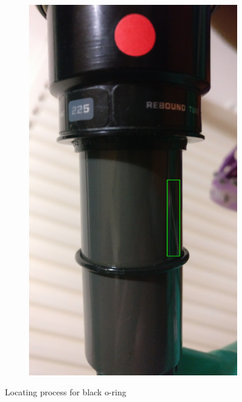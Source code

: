 \begin{figure}[h!]
\begin{subfigure}[t]{0.4\textwidth}
					\includegraphics[scale=0.04]{../images/results/fox_oring.jpg}	
					\label{subfig:fox_oring}
				\end{subfigure}
				\caption{Locating process for black o-ring}
				\label{fig:fox_oring}
			\end{figure}
